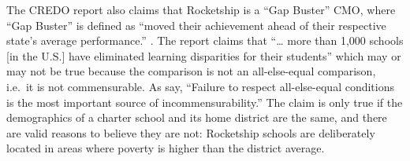 The CREDO report also claims that Rocketship is a ``Gap Buster'' CMO, where ``Gap Buster'' is defined as ``moved their achievement ahead of their respective state’s average performance.'' \parencite[14]{Raymond.etal2023}. The report claims that ``\ldots{} more than 1,000 schools [in the U.S.] have eliminated learning disparities for their students'' \parencite[14]{Raymond.etal2023} which may or may not be true because the comparison is not an all-else-equal comparison, i.e.\ it is not commensurable. As \textcite[16]{Ashworth.etal2021} say, ``Failure to respect all-else-equal conditions is the most important source of incommensurability.'' The claim is only true if the demographics of a charter school and its home district are the same, and there are valid reasons to believe they are not: Rocketship schools are deliberately located in areas where poverty is higher than the district average.

